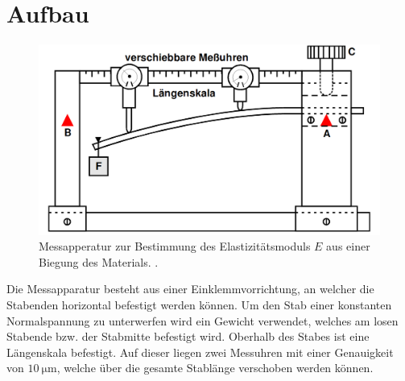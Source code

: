 \section{Aufbau}
\label{sec:Aufbau}

\begin{figure}[H]
         \centering
         \includegraphics[width=\linewidth-150pt,height=\textheight-150pt,keepaspectratio]{content/Bilder/aufbau.png}
         \caption{Messapperatur zur Bestimmung des Elastizitätsmoduls $E$ aus einer Biegung des Materials. \cite{V103}.}
         \label{fig:Aufbau}
       \end{figure}

Die Messapparatur besteht aus einer Einklemmvorrichtung, an welcher die Stabenden horizontal befestigt werden können.
Um den Stab einer konstanten Normalspannung zu unterwerfen wird ein Gewicht verwendet,
 welches am losen Stabende bzw. der Stabmitte befestigt wird. Oberhalb des Stabes ist eine
 Längenskala befestigt. Auf dieser liegen zwei Messuhren mit einer Genauigkeit von  $\SI{10}{\micro\meter}$, welche
 über die gesamte Stablänge verschoben werden können.
